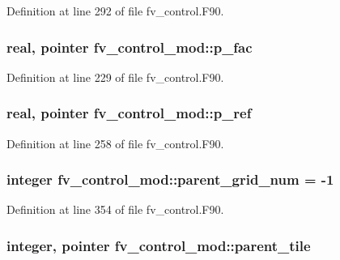 Definition at line 292 of file fv\-\_\-control.\-F90.

\subsubsection[{p\-\_\-fac}]{\setlength{\rightskip}{0pt plus 5cm}real, pointer fv\-\_\-control\-\_\-mod\-::p\-\_\-fac\hspace{0.3cm}{\ttfamily [private]}}\label{classfv__control__mod_ad983b216be38cb6ce1bb231af7257939}


Definition at line 229 of file fv\-\_\-control.\-F90.

\subsubsection[{p\-\_\-ref}]{\setlength{\rightskip}{0pt plus 5cm}real, pointer fv\-\_\-control\-\_\-mod\-::p\-\_\-ref\hspace{0.3cm}{\ttfamily [private]}}\label{classfv__control__mod_afde12ac7af6b571a903c1927932582ff}


Definition at line 258 of file fv\-\_\-control.\-F90.

\subsubsection[{parent\-\_\-grid\-\_\-num}]{\setlength{\rightskip}{0pt plus 5cm}integer fv\-\_\-control\-\_\-mod\-::parent\-\_\-grid\-\_\-num = -\/1\hspace{0.3cm}{\ttfamily [private]}}\label{classfv__control__mod_ab921b928551b09feff4a8f27ab427293}


Definition at line 354 of file fv\-\_\-control.\-F90.

\subsubsection[{parent\-\_\-tile}]{\setlength{\rightskip}{0pt plus 5cm}integer, pointer fv\-\_\-control\-\_\-mod\-::parent\-\_\-tile\hspace{0.3cm}{\ttfamily [private]}}\label{classfv__control__mod_aa8414caeda62e3b0d0323b5651dc6ceb}


